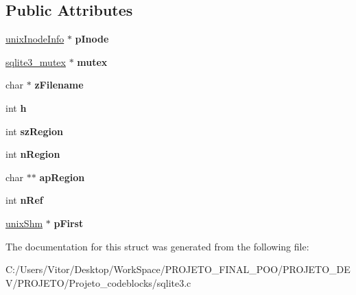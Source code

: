 \subsection*{Public Attributes}
\begin{DoxyCompactItemize}
\item 
\hypertarget{structunix_shm_node_ab6bc1cf84d65887a3395da6406843817}{\hyperlink{structunix_inode_info}{unix\-Inode\-Info} $\ast$ {\bfseries p\-Inode}}\label{structunix_shm_node_ab6bc1cf84d65887a3395da6406843817}

\item 
\hypertarget{structunix_shm_node_aa90850530f48fec6f2a872874f8ddf1f}{\hyperlink{structsqlite3__mutex}{sqlite3\-\_\-mutex} $\ast$ {\bfseries mutex}}\label{structunix_shm_node_aa90850530f48fec6f2a872874f8ddf1f}

\item 
\hypertarget{structunix_shm_node_a188c3bc5fcb4666ad0817ac093e7505d}{char $\ast$ {\bfseries z\-Filename}}\label{structunix_shm_node_a188c3bc5fcb4666ad0817ac093e7505d}

\item 
\hypertarget{structunix_shm_node_a9cd93c8052eb47f257e2d752e8f1fdba}{int {\bfseries h}}\label{structunix_shm_node_a9cd93c8052eb47f257e2d752e8f1fdba}

\item 
\hypertarget{structunix_shm_node_ae8126f9db70a758c2f340ec06869e02b}{int {\bfseries sz\-Region}}\label{structunix_shm_node_ae8126f9db70a758c2f340ec06869e02b}

\item 
\hypertarget{structunix_shm_node_a7cb3ca3dd29e6f845304000b83dff03a}{int {\bfseries n\-Region}}\label{structunix_shm_node_a7cb3ca3dd29e6f845304000b83dff03a}

\item 
\hypertarget{structunix_shm_node_a8eff550f9b10a2de463e9874f84efc5e}{char $\ast$$\ast$ {\bfseries ap\-Region}}\label{structunix_shm_node_a8eff550f9b10a2de463e9874f84efc5e}

\item 
\hypertarget{structunix_shm_node_a6d9f0c9dec3f6710cb09c90723a8284b}{int {\bfseries n\-Ref}}\label{structunix_shm_node_a6d9f0c9dec3f6710cb09c90723a8284b}

\item 
\hypertarget{structunix_shm_node_a0ddd6c4625acf5994a60b0c368bc665e}{\hyperlink{structunix_shm}{unix\-Shm} $\ast$ {\bfseries p\-First}}\label{structunix_shm_node_a0ddd6c4625acf5994a60b0c368bc665e}

\end{DoxyCompactItemize}


The documentation for this struct was generated from the following file\-:\begin{DoxyCompactItemize}
\item 
C\-:/\-Users/\-Vitor/\-Desktop/\-Work\-Space/\-P\-R\-O\-J\-E\-T\-O\-\_\-\-F\-I\-N\-A\-L\-\_\-\-P\-O\-O/\-P\-R\-O\-J\-E\-T\-O\-\_\-\-D\-E\-V/\-P\-R\-O\-J\-E\-T\-O/\-Projeto\-\_\-codeblocks/sqlite3.\-c\end{DoxyCompactItemize}
